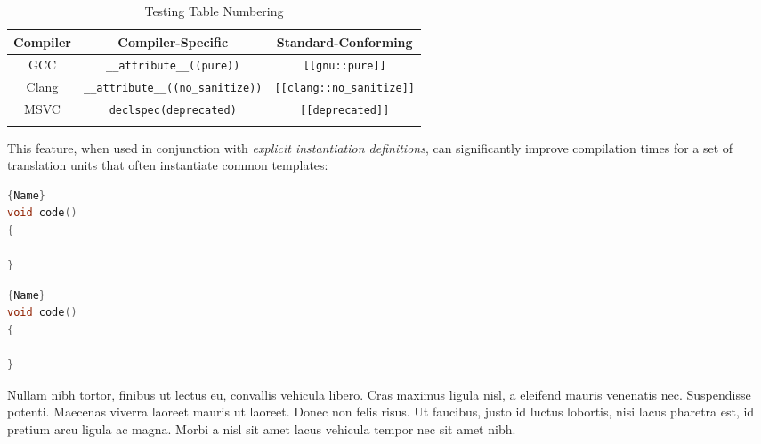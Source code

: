 \begin{table}[h!] 
\begin{center}
\begin{threeparttable}
\caption{Testing Table Numbering}\label{test-table4}\vspace{1.5ex} 
{\small \begin{tabular}{c|c|c}\thickhline 
\rowcolor[gray]{.9}   {\sffamily\bfseries Compiler} & {\sffamily\bfseries Compiler-Specific} &
{\sffamily\bfseries Standard-Conforming} \\ \hline 
GCC &\texttt{\_\_attribute\_\_((pure))} & \texttt{[[gnu::pure]]} \\ \hline
Clang & \texttt{\_\_attribute\_\_((no\_sanitize))} &\texttt{[[clang::no\_sanitize]]} \\ \hline 
MSVC & \texttt{declspec(deprecated)} & \texttt{[[deprecated]]} \\ \thickhline
\end{tabular}
}
\end{threeparttable} 
\end{center}
\end{table}

This feature, when used in conjunction with \emph{explicit instantiation
definitions}, can significantly improve compilation times for a set of
translation units that often instantiate common templates:

\noindent\begin{minipage}{.45\textwidth}
\begin{lstlisting}[language=C++, caption=code 1,frame=tb]{Name}
void code()
{

}
\end{lstlisting}
\end{minipage}\hfill
\begin{minipage}{.45\textwidth}
\begin{lstlisting}[language=C++, caption=code 2,frame=tb]{Name}
void code()
{

}
\end{lstlisting}
\end{minipage}

Nullam nibh tortor, finibus ut lectus eu, convallis vehicula libero. Cras maximus ligula nisl, a eleifend mauris venenatis nec. Suspendisse potenti. Maecenas viverra laoreet mauris ut laoreet. Donec non felis risus. Ut faucibus, justo id luctus lobortis, nisi lacus pharetra est, id pretium arcu ligula ac magna. Morbi a nisl sit amet lacus vehicula tempor nec sit amet nibh. 

